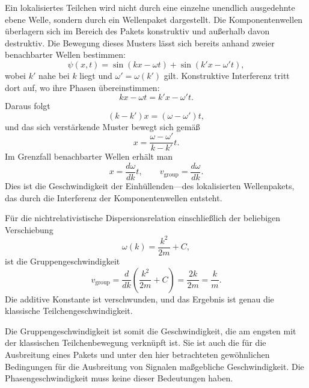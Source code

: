 Ein lokalisiertes Teilchen wird nicht durch eine einzelne unendlich ausgedehnte ebene Welle, sondern durch ein Wellenpaket dargestellt. Die Komponentenwellen überlagern sich im Bereich des Pakets konstruktiv und außerhalb davon destruktiv. Die Bewegung dieses Musters lässt sich bereits anhand zweier benachbarter Wellen bestimmen:
\begin{equation}
\psi(x,t)=
\sin(kx-\omega t)+
\sin(k'x-\omega't),
\end{equation}
wobei \(k'\) nahe bei \(k\) liegt und \(\omega'=\omega(k')\) gilt. Konstruktive Interferenz tritt dort auf, wo ihre Phasen übereinstimmen:
\begin{equation}
kx-\omega t=k'x-\omega't.
\end{equation}
Daraus folgt
\begin{equation}
(k-k')x=(\omega-\omega')t,
\end{equation}
und das sich verstärkende Muster bewegt sich gemäß
\begin{equation}
x=\frac{\omega-\omega'}{k-k'}t.
\end{equation}
Im Grenzfall benachbarter Wellen erhält man
\begin{equation}
x=\frac{d\omega}{dk}t,
\qquad
v_{\mathrm{group}}=\frac{d\omega}{dk}.
\end{equation}
Dies ist die Geschwindigkeit der Einhüllenden---des lokalisierten Wellenpakets, das durch die Interferenz der Komponentenwellen entsteht.

Für die nichtrelativistische Dispersionsrelation einschließlich der beliebigen Verschiebung
\begin{equation}
\omega(k)=\frac{k^2}{2m}+C,
\end{equation}
ist die Gruppengeschwindigkeit
\begin{equation}
v_{\mathrm{group}}
=\frac{d}{dk}\left(\frac{k^2}{2m}+C\right)
=\frac{2k}{2m}
=\frac{k}{m}.
\end{equation}
Die additive Konstante ist verschwunden, und das Ergebnis ist genau die klassische Teilchengeschwindigkeit.

\begin{classroomqa}
\end{classroomqa}

Die Gruppengeschwindigkeit ist somit die Geschwindigkeit, die am engsten mit der klassischen Teilchenbewegung verknüpft ist. Sie ist auch die für die Ausbreitung eines Pakets und unter den hier betrachteten gewöhnlichen Bedingungen für die Ausbreitung von Signalen maßgebliche Geschwindigkeit. Die Phasengeschwindigkeit muss keine dieser Bedeutungen haben.

